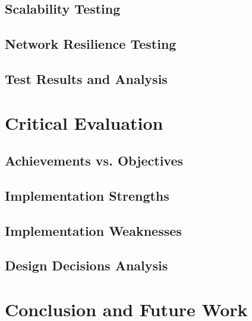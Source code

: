 \documentclass[12pt,a4paper]{report}
\begin{document}
\section{Scalability Testing}

\section{Network Resilience Testing}

\section{Test Results and Analysis}

\chapter{Critical Evaluation}
\section{Achievements vs. Objectives}

\section{Implementation Strengths}

\section{Implementation Weaknesses}

\section{Design Decisions Analysis}

\chapter{Conclusion and Future Work}
\end{document}
